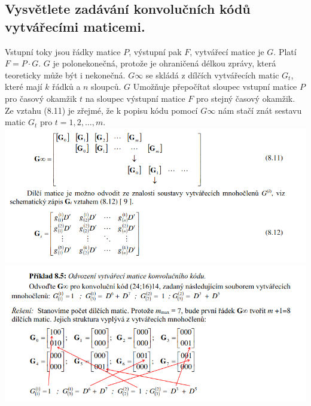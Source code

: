 \subsection{Vysvětlete zadávání konvolučních kódů vytvářecími maticemi.}
Vstupní toky jsou řádky matice $P$, výstupní pak $F$, vytvářecí matice je $G$. Platí $F=P\cdot G$. $G$ je
polonekonečná, protože je ohraničená délkou zprávy, která teoreticky může být i nekonečná. $G\infty$ 
se skládá z dílčích vytvářecích matic $G_t$, které mají $k$ řádků a $n$ sloupců. $G$ Umožňuje přepočítat sloupec 
vstupní matice $P$ pro časový okamžik $t$ na sloupec výstupní matice $F$ pro stejný časový okamžik. Ze vztahu (8.11) je zřejmé, že k popisu kódu pomocí $G\infty$ nám stačí znát sestavu matic $G_t$ pro $t = 1, 2, \dots, m$. \\
\includegraphics[width=16cm]{images/8_matice.png} \\
\includegraphics[width=16cm]{images/8_odvozeni.png}


